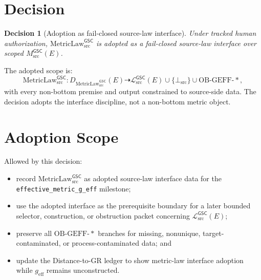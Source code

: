\documentclass[11pt]{article}
\newcommand{\MsrcGSC}{M_{\mathrm{src}}^{\mathsf{GSC}}}
\newcommand{\MetricLaw}{\mathrm{MetricLaw}_{\mathrm{src}}^{\mathsf{GSC}}}
\newcommand{\MetricData}{\mathcal{L}_{\mathrm{src}}^{\mathsf{GSC}}}
\newcommand{\BottomSrc}{\bot_{\mathrm{src}}}
\newcommand{\geff}{g_{\mathrm{eff}}}
\newtheorem{decision}{Decision}
\begin{document}
\section{Decision}

\begin{decision}[Adoption as fail-closed source-law interface]
Under tracked human authorization, \(\MetricLaw\) is adopted as a
fail-closed source-law interface over scoped \(\MsrcGSC(E)\).
\end{decision}

The adopted scope is:
\[
  \MetricLaw:
  D_{\MetricLaw}(E)
  \dashrightarrow
  \MetricData(E)
  \cup
  \{\BottomSrc\}
  \cup
  \mathrm{OB\mbox{-}GEFF\mbox{-}*},
\]
with every non-bottom premise and output constrained to source-side data.
The decision adopts the interface discipline, not a non-bottom metric object.

\section{Adoption Scope}

Allowed by this decision:
\begin{itemize}[leftmargin=*]
  \item record \(\MetricLaw\) as adopted source-law interface data for the
  \texttt{effective\_metric\_g\_eff} milestone;
  \item use the adopted interface as the prerequisite boundary for a later
  bounded selector, construction, or obstruction packet concerning
  \(\MetricData(E)\);
  \item preserve all \(\mathrm{OB\mbox{-}GEFF\mbox{-}*}\) branches for
  missing, nonunique, target-contaminated, or process-contaminated data; and
  \item update the Distance-to-GR ledger to show metric-law interface
  adoption while \(\geff\) remains unconstructed.
\end{itemize}
\end{document}
